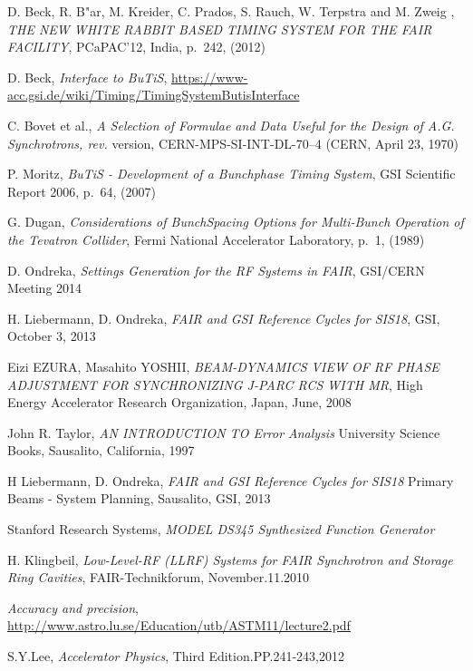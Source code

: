 \begin{thebibliography}{99} 

	D. Beck, R. B"ar, M. Kreider, C. Prados, S. Rauch, W. Terpstra and M. Zweig ,
	\textit{THE NEW WHITE RABBIT BASED TIMING SYSTEM FOR THE FAIR FACILITY},
	PCaPAC'12, India, p.~242, (2012)

	D. Beck, 
     \textit{Interface to BuTiS},
	\url{https://www-acc.gsi.de/wiki/Timing/TimingSystemButisInterface}

	C. Bovet et al.,
     \textit{A Selection of Formulae and Data Useful for the Design of A.G. Synchrotrons,
rev.}
	version, CERN-MPS-SI-INT-DL-70–4 (CERN, April 23, 1970)

	P. Moritz,
	\textit{BuTiS - Development of a Bunchphase Timing System},
	GSI Scientific Report 2006, p.~64, (2007)

	G. Dugan,
	\textit{Considerations of BunchSpacing Options for Multi-Bunch Operation of the Tevatron Collider},
	Fermi National Accelerator Laboratory, p.~1, (1989)


     D. Ondreka,
	\textit{Settings Generation for the RF Systems in FAIR},
	GSI/CERN Meeting 2014

     H. Liebermann, D. Ondreka,
	\textit{FAIR and GSI Reference Cycles for SIS18},
	GSI, October 3, 2013

     Eizi EZURA, Masahito YOSHII,
	\textit{BEAM-DYNAMICS VIEW OF RF PHASE ADJUSTMENT FOR SYNCHRONIZING J-PARC RCS WITH MR},
	High Energy Accelerator Research Organization, Japan, June, 2008

    John R. Taylor,
    \textit{AN INTRODUCTION TO Error Analysis} 
    University Science Books, Sausalito, California, 1997

    H Liebermann, D. Ondreka,
    \textit{FAIR and GSI Reference Cycles for SIS18} 
    Primary Beams - System Planning, Sausalito, GSI, 2013 

     Stanford Research Systems,
	\textit{MODEL DS345 Synthesized Function Generator}

      H. Klingbeil,
      \textit{Low-Level-RF (LLRF) Systems for FAIR Synchrotron and Storage Ring Cavities},
      FAIR-Technikforum, November.11.2010

     \textit{Accuracy and precision},
	\url{http://www.astro.lu.se/Education/utb/ASTM11/lecture2.pdf}

      S.Y.Lee,
      \textit{Accelerator 	Physics},
      Third Edition.PP.241-243,2012 
\addtocounter{enumi}{10}


\end{thebibliography}



